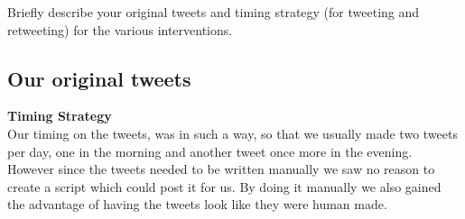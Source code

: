 Briefly describe your original tweets and timing strategy (for tweeting and retweeting) for the various interventions.\\

\subsection{Our original tweets}


\textbf{Timing Strategy}\\
Our timing on the tweets, was in such a way, so that we usually made two tweets per day, one in the morning and another tweet once more in the evening. However since the tweets needed to be written manually we saw no reason to create a script which could post it for us. By doing it manually we also gained the advantage of having the tweets look like they were human made.
